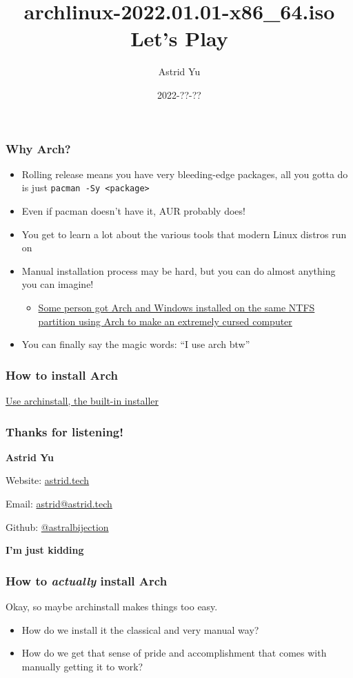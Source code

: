 \documentclass{beamer}
\title{archlinux-2022.01.01-x86\_64.iso Let's Play}
\author{Astrid Yu}
\institute{Cal Poly Linux Users Group}
\date{2022-??-??}
\begin{document}
\frame{\titlepage}

\begin{frame}
    \frametitle{Why Arch?}
    \begin{itemize}
        \item Rolling release means you have very bleeding-edge packages, all you gotta do is just \texttt{pacman -Sy <package>}
        \item Even if pacman doesn't have it, AUR probably does!
        \item You get to learn a lot about the various tools that modern Linux distros run on
        \item Manual installation process may be hard, but you can do almost anything you can imagine!
            \begin{itemize}
                \item \href{https://gist.github.com/motorailgun/cc2c573f253d0893f429a165b5f851ee}{Some person got Arch and Windows installed on the same NTFS partition using Arch to make an extremely cursed computer}
            \end{itemize} \pause
        \item You can finally say the magic words: ``I use arch btw''
    \end{itemize}
\end{frame}

\begin{frame}
    \frametitle{How to install Arch}
    \Huge
    \href{https://wiki.archlinux.org/title/Archinstall}{Use archinstall, the built-in installer}
\end{frame}

\newcommand{\thankyouframe}{
    \frametitle{Thanks for listening!}

    {\large \textbf{Astrid Yu}}

    Website: \href{https://astrid.tech}{astrid.tech}

    Email: \href{mailto:astrid@astrid.tech}{astrid@astrid.tech}
    
    Github: \href{https://github.com/astralbijection}{@astralbijection}
}

\begin{frame}
    \thankyouframe \pause

    \centering
    \huge
    \textbf{I'm just kidding}
\end{frame}

\begin{frame}
    \frametitle{How to \textit{actually} install Arch}
    Okay, so maybe archinstall makes things too easy.
    \begin{itemize}
        \item How do we install it the classical and very manual way?
        \item How do we get that sense of pride and accomplishment that comes with manually getting it to work?
    \end{itemize}
\end{frame}
\end{document}
